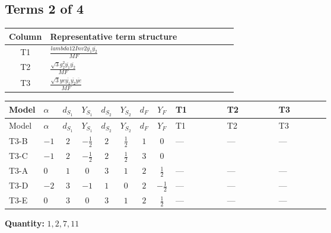\documentclass[8pt]{article}
\begin{document}
\begin{landscape}
\subsection*{Terms 2 of 4}
\begin{center}
\begin{tabular}{@{}c >{\raggedright\arraybackslash}p{0.82\linewidth}@{}}
\toprule
Column & Representative term structure \\
\midrule
T1 & \(\displaystyle \frac{lambda12Inv2 \overline{y_{1}} \overline{y_{2}}}{MF}\) \\
\midrule
T2 & \(\displaystyle \frac{\sqrt{3} g_{2}^{2} \overline{y_{1}} \overline{y_{2}}}{MF}\) \\
\midrule
T3 & \(\displaystyle \frac{\sqrt{3} ye \overline{y_{1}} \overline{y_{2}} \overline{ye}}{MF}\) \\
\midrule
\bottomrule
\end{tabular}
\end{center}
\smallskip
\tiny
\begin{longtable}{@{}llcccccc >{\raggedright\arraybackslash}p{0.21\linewidth} >{\raggedright\arraybackslash}p{0.21\linewidth} >{\raggedright\arraybackslash}p{0.21\linewidth}@{}}
\toprule
Model & $\alpha$ & $d_{S_1}$ & $Y_{S_1}$ & $d_{S_2}$ & $Y_{S_2}$ & $d_F$ & $Y_F$ & T1 & T2 & T3 \\
\midrule
\endfirsthead
\toprule
Model & $\alpha$ & $d_{S_1}$ & $Y_{S_1}$ & $d_{S_2}$ & $Y_{S_2}$ & $d_F$ & $Y_F$ & T1 & T2 & T3 \\
\midrule
\endhead
T3-B & $-1$ & $2$ & $-\frac{1}{2}$ & $2$ & $\frac{1}{2}$ & $1$ & $0$ & --- & --- & --- \\
\midrule
T3-C & $-1$ & $2$ & $-\frac{1}{2}$ & $2$ & $\frac{1}{2}$ & $3$ & $0$ & \scriptsize\adjustbox{max width=\linewidth}{$\begin{gathered} \frac{lambda12Inv2 \overline{y_{1}} \overline{y_{2}}}{6 MF}\end{gathered}$} & \scriptsize\adjustbox{max width=\linewidth}{$\begin{gathered} \frac{\sqrt{3} g_{2}^{2} \overline{y_{1}} \overline{y_{2}}}{8 MF}\end{gathered}$} & \scriptsize\adjustbox{max width=\linewidth}{$\begin{gathered} - \frac{\sqrt{3} ye \overline{y_{1}} \overline{y_{2}} \overline{ye}}{24 MF}\end{gathered}$} \\
\midrule
T3-A & $0$ & $1$ & $0$ & $3$ & $1$ & $2$ & $\frac{1}{2}$ & --- & --- & --- \\
\midrule
T3-D & $-2$ & $3$ & $-1$ & $1$ & $0$ & $2$ & $-\frac{1}{2}$ & --- & --- & --- \\
\midrule
T3-E & $0$ & $3$ & $0$ & $3$ & $1$ & $2$ & $\frac{1}{2}$ & --- & --- & --- \\
\midrule
\bottomrule
\end{longtable}
\clearpage
\noindent\textbf{Quantity: }$\mathrm{1,2,7,11}$\par\smallskip

\end{landscape}
\end{document}

